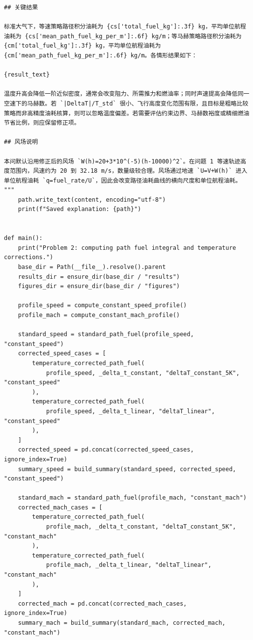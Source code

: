 \documentclass[withoutpreface,bwprint]{cumcmthesis} %
\begin{document}
\begin{center}
\begin{lstlisting}
## 关键结果

标准大气下，等速策略路径积分油耗为 {cs['total_fuel_kg']:.3f} kg，平均单位航程油耗为 {cs['mean_path_fuel_kg_per_m']:.6f} kg/m；等马赫策略路径积分油耗为 {cm['total_fuel_kg']:.3f} kg，平均单位航程油耗为 {cm['mean_path_fuel_kg_per_m']:.6f} kg/m。各情形结果如下：

{result_text}

温度升高会降低一阶近似密度，通常会改变阻力、所需推力和燃油率；同时声速提高会降低同一空速下的马赫数。若 `|DeltaT|/T_std` 很小、飞行高度变化范围有限，且目标是粗略比较策略而非高精度油耗核算，则可以忽略温度偏差。若需要评估约束边界、马赫数裕度或精细燃油节省比例，则应保留修正项。

## 风场说明

本问默认沿用修正后的风场 `W(h)=20+3*10^(-5)(h-10000)^2`。在问题 1 等速轨迹高度范围内，风速约为 20 到 32.18 m/s，数量级较合理。风场通过地速 `U=V+W(h)` 进入单位航程油耗 `q=fuel_rate/U`，因此会改变路径油耗曲线的横向尺度和单位航程油耗。
"""
    path.write_text(content, encoding="utf-8")
    print(f"Saved explanation: {path}")


def main():
    print("Problem 2: computing path fuel integral and temperature corrections.")
    base_dir = Path(__file__).resolve().parent
    results_dir = ensure_dir(base_dir / "results")
    figures_dir = ensure_dir(base_dir / "figures")

    profile_speed = compute_constant_speed_profile()
    profile_mach = compute_constant_mach_profile()

    standard_speed = standard_path_fuel(profile_speed, "constant_speed")
    corrected_speed_cases = [
        temperature_corrected_path_fuel(
            profile_speed, _delta_t_constant, "deltaT_constant_5K", "constant_speed"
        ),
        temperature_corrected_path_fuel(
            profile_speed, _delta_t_linear, "deltaT_linear", "constant_speed"
        ),
    ]
    corrected_speed = pd.concat(corrected_speed_cases, ignore_index=True)
    summary_speed = build_summary(standard_speed, corrected_speed, "constant_speed")

    standard_mach = standard_path_fuel(profile_mach, "constant_mach")
    corrected_mach_cases = [
        temperature_corrected_path_fuel(
            profile_mach, _delta_t_constant, "deltaT_constant_5K", "constant_mach"
        ),
        temperature_corrected_path_fuel(
            profile_mach, _delta_t_linear, "deltaT_linear", "constant_mach"
        ),
    ]
    corrected_mach = pd.concat(corrected_mach_cases, ignore_index=True)
    summary_mach = build_summary(standard_mach, corrected_mach, "constant_mach")


\end{lstlisting}
\end{center}
\end{document}
